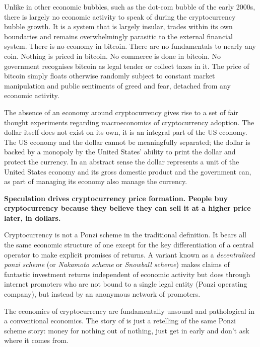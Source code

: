 Unlike in other economic bubbles, such as the dot-com bubble of the early 2000s,
there is largely no economic activity to speak of during the cryptocurrency
bubble growth. It is a system that is largely insular, trades within its own
boundaries and remains overwhelmingly parasitic to the external financial
system. There is no economy in bitcoin. There are no fundamentals to nearly any
coin. Nothing is priced in bitcoin. No commerce is done in bitcoin. No
government recognises bitcoin as legal tender or collect taxes in it.  The price
of bitcoin simply floats otherwise randomly subject to constant market
manipulation and public sentiments of greed and fear, detached from any economic
activity.

The absence of an economy around cryptocurrency gives rise to a set of fair
thought experiments regarding macroeconomics of cryptocurrency adoption. The
dollar itself does not exist on its own, it is an integral part of the US
economy. The US economy and the dollar cannot be meaningfully separated; the
dollar is backed by a monopoly by the United States' ability to print the dollar
and protect the currency. In an abstract sense the dollar represents a unit of
the United States economy and its gross domestic product and the government can,
as part of managing its economy also manage the currency.


\begin{infobox}
 \textbf{Speculation drives cryptocurrency price formation. People buy
  cryptocurrency because they believe they can sell it at a higher price later,
  in dollars.}
\end{infobox}

Cryptocurrency is not a Ponzi scheme in the traditional definition.  It bears
all the same economic structure of one except for the key differentiation of a
central operator to make explicit promises of returns. A variant known as a
\textit{decentralized ponzi scheme} (or \textit{Nakamoto scheme} or
\textit{Snowball scheme}) makes claims of fantastic investment returns
independent of economic activity but does through internet promoters who are not
bound to a single legal entity (Ponzi operating company), but instead by an
anonymous network of promoters.


The economics of cryptocurrency are fundamentally unsound and pathological in a
conventional economics. The story of is just a retelling of the same Ponzi
scheme story: money for nothing out of nothing, just get in early and don't ask
where it comes from.
